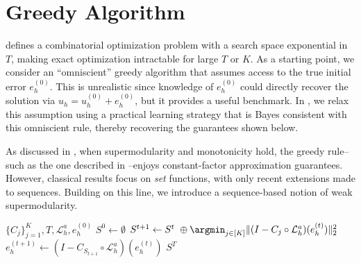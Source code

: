 \documentclass{article}
\begin{document}


\section{Greedy Algorithm} \label{sec:greedy}

 defines a combinatorial optimization problem with a search space exponential in $T$, making exact optimization intractable for large $T$ or $K$. As a starting point, we consider an ``omniscient'' greedy algorithm that assumes access to the true initial error $e^{(0)}_h$. This is unrealistic since knowledge of $e^{(0)}_h$ could directly recover the solution via $u_h = u^{(0)}_h + e^{(0)}_h$, but it provides a useful benchmark.
In , we relax this assumption using a practical learning strategy that is Bayes consistent with this omniscient rule, thereby recovering the guarantees shown below.

As discussed in , when supermodularity and monotonicity hold, the greedy rule--such as the one described in --enjoys constant-factor approximation guarantees. However, classical results focus on \textit{set} functions, with only recent extensions made to sequences. Building on this line, we introduce a sequence-based notion of weak supermodularity.

\begin{algorithm} 
\caption{Greedy Algorithm for a Hybrid PDE solver}\label{alg:greedy}
\begin{algorithmic}
\Require $\{C_{j}\}_{j = 1}^{K}, T, \mathcal{L}_h^a, e^{(0)}_h$
\State $S^{0} \gets \emptyset$
    \State $S^{t + 1} \gets S^{t} \ \oplus \argmin_{j \in [K]}\|( I - C_{j} \circ \mathcal{L}_{h}^a)(e^{(t)}_h)\|^2_2$
    \State $e^{(t + 1)}_h \gets (I - C_{S_{t+ 1}} \circ \mathcal{L}_{h}^a) (e^{(t)}_h)$
\EndFor
\State \Return $S^{T}$
\end{algorithmic}
\end{algorithm}
\end{document}
